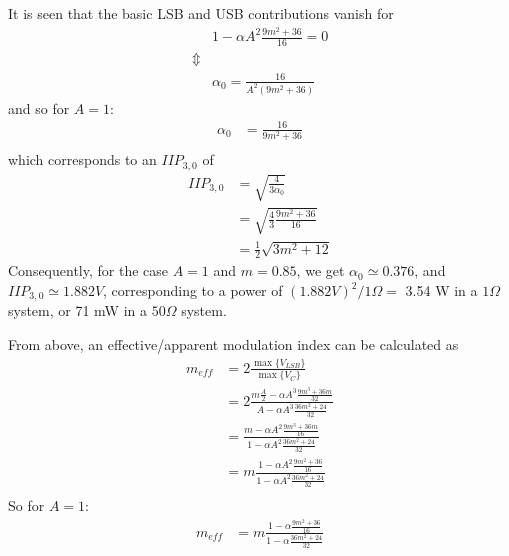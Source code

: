 \documentclass[12pt]{article}
\begin{document}
It is seen that the basic LSB and USB contributions vanish for 
\begin{equation}
\begin{aligned}
             & 1 - \alpha A^2 \frac{9 m^2 + 36}{16} = 0 \\
\Updownarrow & \\
             & \alpha_0 = \frac{16}{A^2(9 m^2 + 36)}
\end{aligned}
\end{equation}
and so for $A=1$: 
\begin{equation}
\begin{aligned}
\alpha_0 &= \frac{16}{9 m^2 + 36} \\
\end{aligned}
\end{equation}
which corresponds to an $IIP_{3,0}$ of
\begin{equation}
\begin{aligned}
IIP_{3,0} &=  \sqrt{ \frac{4}{3 \alpha_0} } \\
      &=  \sqrt{ \frac{4}{3} \frac{9m^2 + 36}{16} } \\
      &=  \frac{1}{2} \sqrt{ 3m^2 + 12 }
\end{aligned}
\end{equation}
Consequently, for the case $A=1$ and $m=0.85$, we get $\alpha_0 \simeq 0.376$, and $IIP_{3,0} \simeq 1.882 V$, corresponding to a power of $(1.882V)^2 / 1\Omega =$ 3.54 W in a $1 \Omega$ system, or 71 mW in a $50 \Omega$ system.

From above, an effective/apparent modulation index can be calculated as 
\begin{equation}
\begin{aligned}
m_{eff} &=  2 \frac{\max{ \{ V_{LSB} \} }}{\max{ \{ V_C \} }} \\
      &=  2 \frac{m\frac{A}{2} - \alpha A^3 \frac{9 m^3 + 36m}{32}}{A - \alpha A^3 \frac{36 m^2 +24}{32}} \\
      &= \frac{m - \alpha A^2 \frac{9 m^3 + 36m}{16}}{1 - \alpha A^2 \frac{36 m^2 +24}{32}} \\
      &= m \frac{1 - \alpha A^2 \frac{9 m^2 + 36}{16}}{1 - \alpha A^2 \frac{36 m^2 +24}{32}} \\
\end{aligned}
\end{equation}
So for $A=1$:
\begin{equation}
\begin{aligned}
m_{eff} &= m \frac{1 - \alpha \frac{9 m^2 + 36}{16}}{1 - \alpha \frac{36 m^2 +24}{32}} \\
\end{aligned}
\end{equation}
\end{document}
